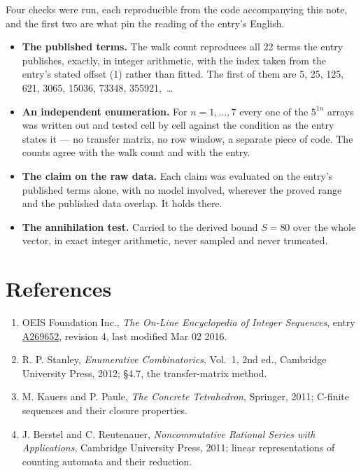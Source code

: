 \documentclass[11pt]{article}
\theoremstyle{definition}
\begin{document}
Four checks were run, each reproducible from the code accompanying this note, and the first two are what pin the reading of the entry's English.

\begin{itemize}

\item {\bfseries The published terms.} The walk count reproduces all 22 terms the entry publishes, exactly, in integer arithmetic, with the index taken from the entry's stated offset (1) rather than fitted. The first of them are 5, 25, 125, 621, 3065, 15036, 73348, 355921,~\dots

\item {\bfseries An independent enumeration.} For $n = 1,\dots,7$ every one of the $5^{1n}$ arrays was written out and tested cell by cell against the condition as the entry states it --- no transfer matrix, no row window, a separate piece of code. The counts agree with the walk count and with the entry.

\item {\bfseries The claim on the raw data.} Each claim was evaluated on the entry's published terms alone, with no model involved, wherever the proved range and the published data overlap. It holds there.

\item {\bfseries The annihilation test.} Carried to the derived bound $S = 80$ over the whole vector, in exact integer arithmetic, never sampled and never truncated.

\end{itemize}

\section{References}

\begin{enumerate}

\item OEIS Foundation Inc., \emph{The On-Line Encyclopedia of Integer Sequences}, entry \href{https://oeis.org/A269652}{A269652}, revision 4, last modified Mar 02 2016.

\item R. P. Stanley, \emph{Enumerative Combinatorics}, Vol.~1, 2nd ed., Cambridge University Press, 2012; \S4.7, the transfer-matrix method.

\item M. Kauers and P. Paule, \emph{The Concrete Tetrahedron}, Springer, 2011; C-finite sequences and their closure properties.

\item J. Berstel and C. Reutenauer, \emph{Noncommutative Rational Series with Applications}, Cambridge University Press, 2011; linear representations of counting automata and their reduction.

\end{enumerate}
\end{document}
